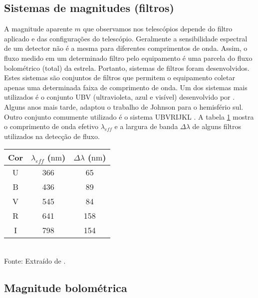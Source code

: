 \subsection{Sistemas de magnitudes (filtros)}

A magnitude aparente $m$ que observamos nos telescópios depende do filtro aplicado e das configurações do telescópio. Geralmente a sensibilidade espectral de um detector não é a mesma para diferentes comprimentos de onda. Assim, o fluxo medido em um determinado filtro pelo equipamento é uma parcela do fluxo bolométrico (total) da estrela. Portanto, sistemas de filtros foram desenvolvidos. Estes sistemas são conjuntos de filtros que permitem o equipamento coletar apenas uma determinada faixa de comprimento de onda. Um dos sistemas mais utilizados é o conjunto UBV (ultravioleta, azul e visível) desenvolvido por \citet{Johnson1953}. Alguns anos mais tarde, \citet{Cousins1973} adaptou o trabalho de Johnson para o hemisfério sul. Outro conjunto comumente utilizado é o sistema UBVRIJKL \citep{Johnson1966}. A tabela \ref{tab:filtros} mostra o comprimento de onda efetivo $\lambda_{eff}$ e a largura de banda $\Delta \lambda$ de alguns filtros utilizados na detecção de fluxo.

\begin{table}[!h]
\begin{center}
\begin{tabular}{c|c|c}
\toprule%
Cor & $\lambda_{eff}$ ($\si{\nano\metre}$) & $\Delta \lambda$ ($\si{\nano\metre}$) \\
\midrule%
U & 366 & 65 \\
B & 436 & 89\\
V & 545 & 84 \\
R & 641 & 158\\
I & 798 & 154 \\
\bottomrule%
\end{tabular} \\
\small
\vspace{2mm}Fonte: Extraído de \citet{Catelan_book}.
\label{tab:filtros}
\end{center}
\end{table}


\subsection{Magnitude bolométrica}

